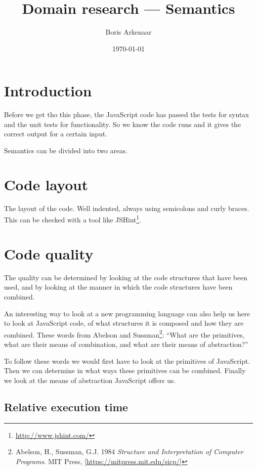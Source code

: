\documentclass{article}
\begin{document}
 

\title{Domain research --- Semantics}
\author{Boris Arkenaar}
\date{\today}
\maketitle 

\section{Introduction} 

Before we get tho this phase, the JavaScript code has passed the tests for
syntax and the unit tests for functionality. So we know the code runs and it
gives the correct output for a certain input.

Semantics can be divided into two areas.

\section{Code layout}

The layout of the code. Well indented, always using semicolons and curly
braces. This can be checked with a tool like
JSHint\footnote{\url{http://www.jshint.com/}}.

\section{Code quality}

The quality can be determined by looking at the code structures that have been
used, and by looking at the manner in which the code structures have been
combined.

An interesting way to look at a new programming language can also help us here
to look at JavaScript code, of what structures it is composed and how they are
combined. These words from Abelson and Sussman\footnote{Abelson, H., Sussman,
G.J. 1984 {\em Structure and Interpretation of Computer Programs}. MIT Press,
[\url{https://mitpress.mit.edu/sicp/}]}: ``What are the primitives, what are
their means of combination, and what are their means of abstraction?''

To follow these words we would first have to look at the primitives of
JavaScript. Then we can determine in what ways these primitives can be
combined. Finally we look at the means of abstraction JavaScript offers us.

\subsection{Relative execution time}
\end{document}
